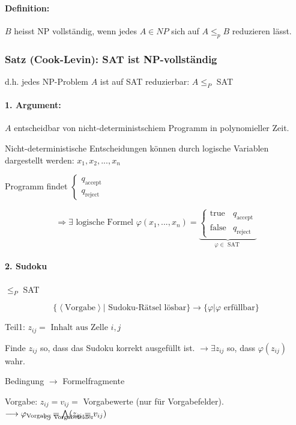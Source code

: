 \paragraph{Definition:} $B$ heisst NP vollständig, wenn jedes $A \in NP$ sich auf $A \leq_p B$ reduzieren lässt.

\subsubsection{Satz (Cook-Levin): SAT ist NP-vollständig}

d.h. jedes NP-Problem $A$ ist auf SAT reduzierbar: $A \leq_P$ SAT

\paragraph{1. Argument: } $A$ entscheidbar von nicht-deterministschiem Programm in polynomieller Zeit.

Nicht-deterministische Entscheidungen können durch logische Variablen dargestellt werden: $x_1,x_2,...,x_n$

Programm findet $\begin{cases}
	q_\text{accept} \\
	q_\text{reject}
\end{cases}$

\[
	\Rightarrow \exists \text{ logische Formel } \varphi(x_1,...,x_n) = \underbrace{\begin{cases}
		\text{true} & q_\text{accept} \\
		\text{false} & q_\text{reject}
	\end{cases}}_{\varphi \in \text{ SAT }}
\]

\paragraph{2. Sudoku} $\leq_P$ SAT

\[
	\{ \left< \text{Vorgabe} \right> | \text{ Sudoku-Rätsel lösbar} \} \longrightarrow \{ \varphi | \varphi \text{ erfüllbar}\}
\]

Teil1: $z_{ij} = \text{ Inhalt aus Zelle } i,j$

Finde $z_{ij}$ so, dass das Sudoku korrekt ausgefüllt ist. $\longrightarrow \exists z_{ij}$ so, dass $\varphi(z_{ij})$ wahr.

Bedingung $\longrightarrow$ Formelfragmente

Vorgabe: $z_{ij} = v_{ij} = $ Vorgabewerte (nur für Vorgabefelder).  
$\longrightarrow \varphi_\text{Vorgabe} = \bigwedge_{\mathclap{i, j \text{ Vorgabefelder}}} (z_{ij} = v_{ij})$

